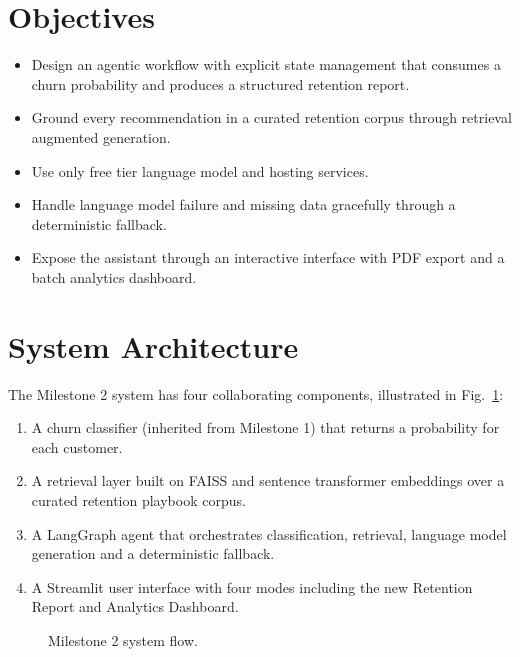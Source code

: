 \documentclass[conference]{IEEEtran}
\begin{document}
\section{Objectives}
\begin{itemize}
    \setlength{\itemsep}{2pt}
    \item Design an agentic workflow with explicit state management that consumes a churn probability and produces a structured retention report.
    \item Ground every recommendation in a curated retention corpus through retrieval augmented generation.
    \item Use only free tier language model and hosting services.
    \item Handle language model failure and missing data gracefully through a deterministic fallback.
    \item Expose the assistant through an interactive interface with PDF export and a batch analytics dashboard.
\end{itemize}

\section{System Architecture}
The Milestone 2 system has four collaborating components, illustrated in Fig.~\ref{fig:arch}:
\begin{enumerate}
    \item A churn classifier (inherited from Milestone 1) that returns a probability for each customer.
    \item A retrieval layer built on FAISS and sentence transformer embeddings over a curated retention playbook corpus.
    \item A LangGraph agent that orchestrates classification, retrieval, language model generation and a deterministic fallback.
    \item A Streamlit user interface with four modes including the new Retention Report and Analytics Dashboard.
\end{enumerate}

\begin{figure}[!h]
\centering
{}
\caption{Milestone 2 system flow.}
\label{fig:arch}
\end{figure}
\end{document}
